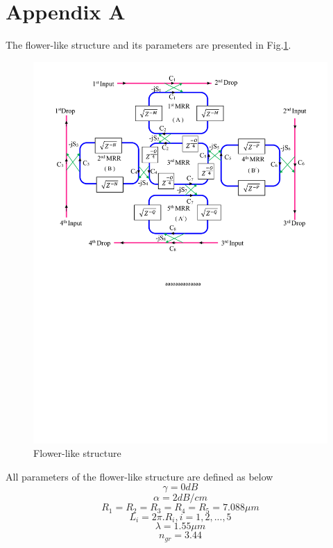 \documentclass{osa-article}
\begin{document}
\section*{Appendix A}
\label{Appendix A}
The flower-like structure and its parameters are presented in Fig.\ref{fig1a_structure}.
   \begin{figure}[tb]
\centering
\includegraphics[width=4 in]{figs/fig1a_structure.pdf}
	\caption{Flower-like structure}
	\label{fig1a_structure}
\end{figure}
All parameters of the flower-like structure are defined as below\\
 \begin{equation}
\gamma=0 dB
\label{eqa1}
\end{equation}
 \begin{equation}
\alpha=2 dB/cm
\label{eqa2}
\end{equation}
 \begin{equation}
R_1=R_2=R_3=R_4=R_5=7.088 {\mu}m
\label{eqa3}
\end{equation}
 \begin{equation}
L_i=2{\pi}.{R_i}, i=1, 2,..., 5
\label{eqa4}
\end{equation}
 \begin{equation}
\lambda=1.55{\mu}m
\label{eqa5}
\end{equation}
 \begin{equation}
  n_{gr}=3.44
  \label{eqa6}
\end{equation}
\end{document}
